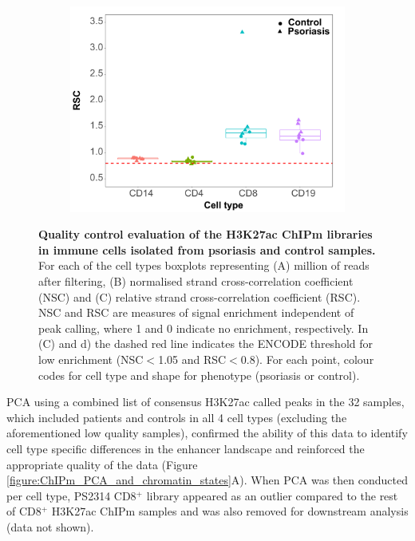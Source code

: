 \begin{figure}[htbp]
\begin{subfigure}{0.5\textwidth}
\includegraphics[width=\textwidth]{./Results2/pdfs/ChIPm_PS_CTL_RSC_boxplot}
\caption{\textbf{}}
\end{subfigure}
\caption[Quality control evaluation of the H3K27ac ChIPm libraries in immune cells isolated from psoriasis and control samples.]{\textbf{Quality control evaluation of the H3K27ac ChIPm libraries in immune cells isolated from psoriasis and control samples.} For each of the cell types boxplots representing (A) million of reads after filtering, (B) normalised strand cross-correlation coefficient (NSC) and (C) relative strand cross-correlation coefficient (RSC). NSC and RSC are measures of signal enrichment independent of peak calling, where 1 and 0 indicate no enrichment, respectively. In (C) and d) the dashed red line indicates the ENCODE threshold for low enrichment (NSC$<$1.05 and RSC$<$0.8). For each point, colour codes for cell type and shape for phenotype (psoriasis or control).}
\label{figure:ChIPm_PS_CTL_QC}
\end{figure} 




PCA using a combined list of consensus H3K27ac called peaks in the 32 samples, which included patients and controls in all 4 cell types (excluding the aforementioned low quality samples), confirmed the ability of this data to identify cell type specific differences in the enhancer landscape and reinforced the appropriate quality of the data (Figure \ref{figure:ChIPm_PCA_and_chromatin_states}A). When PCA was then conducted per cell type, PS2314 CD8$^+$ library appeared as an outlier compared to the rest of CD8$^+$ H3K27ac ChIPm samples and was also removed for downstream analysis (data not shown). 


